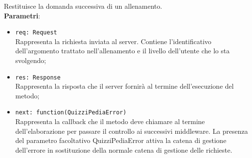\begin{itemize}
\begin{itemize}
			Restituisce la domanda successiva di un allenamento.  \\
			\textbf{Parametri}:
			\begin{itemize}
			\item \texttt{req: Request} \\
			Rappresenta la richiesta inviata al server. Contiene l'identificativo dell'argomento trattato nell'allenamento e il livello dell'utente che lo sta svolgendo;
			\item \texttt{res: Response} \\
			Rappresenta la risposta che il server fornirà al termine dell'esecuzione del metodo;
			\item \texttt{next: function(QuizziPediaError)} \\
			Rappresenta la callback che il metodo deve chiamare al termine dell'elaborazione per passare il controllo ai successivi middleware. La presenza del parametro facoltativo QuizziPediaError attiva la catena di gestione dell'errore in sostituzione della normale catena di gestione delle richieste.
			\end{itemize}
		\end{itemize}
\end{itemize}
